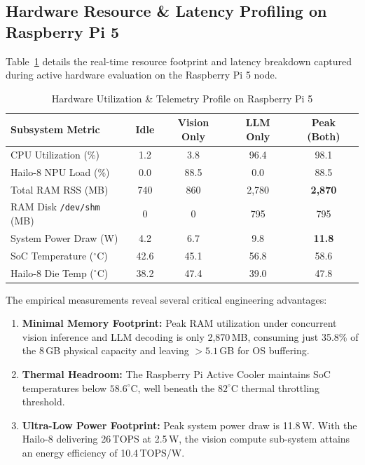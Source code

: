 \documentclass[conference]{IEEEtran}
\begin{document}
\subsection{Hardware Resource & Latency Profiling on Raspberry Pi 5}
Table~\ref{tab:telemetry} details the real-time resource footprint and latency breakdown captured during active hardware evaluation on the Raspberry Pi 5 node.

\begin{table}[h]
\centering
\caption{Hardware Utilization \& Telemetry Profile on Raspberry Pi 5}
\label{tab:telemetry}
\begin{tabular}{@{}lcccc@{}}
\toprule
\textbf{Subsystem Metric} & \textbf{Idle} & \textbf{Vision Only} & \textbf{LLM Only} & \textbf{Peak (Both)} \\ \midrule
CPU Utilization (\%) & 1.2 & 3.8 & 96.4 & 98.1 \\
Hailo-8 NPU Load (\%) & 0.0 & 88.5 & 0.0 & 88.5 \\
Total RAM RSS (MB) & 740 & 860 & 2,780 & \textbf{2,870} \\
RAM Disk \texttt{/dev/shm} (MB) & 0 & 0 & 795 & 795 \\
System Power Draw (W) & 4.2 & 6.7 & 9.8 & \textbf{11.8} \\
SoC Temperature ($^\circ$C) & 42.6 & 45.1 & 56.8 & 58.6 \\
Hailo-8 Die Temp ($^\circ$C) & 38.2 & 47.4 & 39.0 & 47.8 \\ \bottomrule
\end{tabular}
\end{table}

The empirical measurements reveal several critical engineering advantages:
\begin{enumerate}
    \item \textbf{Minimal Memory Footprint:} Peak RAM utilization under concurrent vision inference and LLM decoding is only 2,870\,MB, consuming just 35.8\% of the 8\,GB physical capacity and leaving $>5.1$\,GB for OS buffering.
    \item \textbf{Thermal Headroom:} The Raspberry Pi Active Cooler maintains SoC temperatures below $58.6^\circ$C, well beneath the $82^\circ$C thermal throttling threshold.
    \item \textbf{Ultra-Low Power Footprint:} Peak system power draw is 11.8\,W. With the Hailo-8 delivering 26\,TOPS at 2.5\,W, the vision compute sub-system attains an energy efficiency of 10.4\,TOPS/W.
\end{enumerate}
\end{document}
